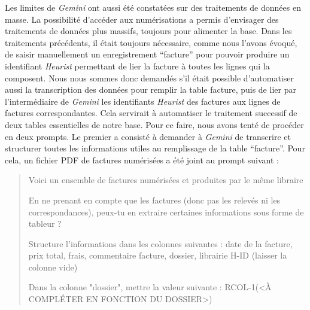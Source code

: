 Les limites de \emph{Gemini} ont aussi été constatées sur des traitements de données en masse. La possibilité d'accéder aux numérisations a permis d'envisager des traitements de données plus massifs, toujours pour alimenter la base. Dans les traitements précédents, il était toujours nécessaire, comme nous l'avons évoqué, de saisir manuellement un enregistrement \enquote{facture} pour pouvoir produire un identifiant \emph{Heurist} permettant de lier la facture à toutes les lignes qui la composent. Nous nous sommes donc demandés s'il était possible d'automatiser aussi la transcription des données pour remplir la table facture, puis de lier par l'intermédiaire de \emph{Gemini} les identifiants \emph{Heurist} des factures aux lignes de factures correspondantes. Cela servirait à automatiser le traitement successif de deux tables essentielles de notre base. Pour ce faire, nous avons tenté de procéder en deux prompts.
Le premier a consisté à demander à \emph{Gemini} de transcrire et structurer toutes les informations utiles au remplissage de la table \enquote{facture}. Pour cela, un fichier PDF de factures numérisées a été joint au prompt suivant :

\begin{quote}
    Voici un ensemble de factures numérisées et produites par le même libraire  

En ne prenant en compte que les factures (donc pas les relevés ni les correspondances), peux-tu en extraire certaines informations sous forme de tableur ? 

Structure l'informations dans les colonnes suivantes : date de la facture, prix total, frais, commentaire facture, dossier, librairie H-ID (laisser la colonne vide)

Dans la colonne "dossier", mettre la valeur suivante : RCOL-1(<À COMPLÉTER EN FONCTION DU DOSSIER>)
\end{quote}

